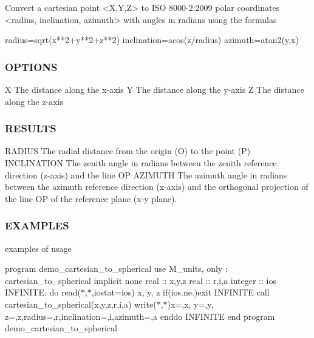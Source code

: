 \begin{DoxyVerb} Convert a cartesian point <X,Y,Z> to ISO 8000-2:2009 polar coordinates <radius,
 inclination, azimuth> with angles in radians using the formulas

   radius=sqrt(x**2+y**2+z**2)
   inclination=acos(z/radius)
   azimuth=atan2(y,x)
\end{DoxyVerb}


\subsubsection*{O\+P\+T\+I\+O\+NS}

X The distance along the x-\/axis Y The distance along the y-\/axis Z The distance along the z-\/axis

\subsubsection*{R\+E\+S\+U\+L\+TS}

\begin{DoxyVerb}RADIUS       The radial distance from the origin (O) to the point (P)
INCLINATION  The zenith angle in radians between the zenith reference direction
             (z-axis) and the line OP
AZIMUTH      The azimuth angle in radians between the azimuth reference direction
             (x-axis) and the orthogonal projection of the line OP of the
             reference plane (x-y plane).
\end{DoxyVerb}


\subsubsection*{E\+X\+A\+M\+P\+L\+ES}

examples of usage

program demo\+\_\+cartesian\+\_\+to\+\_\+spherical use M\+\_\+units, only \+: cartesian\+\_\+to\+\_\+spherical implicit none real \+:\+: x,y,z real \+:\+: r,i,a integer \+:\+: ios I\+N\+F\+I\+N\+I\+TE\+: do read($\ast$,$\ast$,iostat=ios) x, y, z if(ios.\+ne.)exit I\+N\+F\+I\+N\+I\+TE call cartesian\+\_\+to\+\_\+spherical(x,y,z,r,i,a) write($\ast$,$\ast$)\textquotesingle{}x=\textquotesingle{},x,\textquotesingle{} y=\textquotesingle{},y,\textquotesingle{} z=\textquotesingle{},z,\textquotesingle{}radius=\textquotesingle{},r,\textquotesingle{}inclination=\textquotesingle{},i,\textquotesingle{}azimuth=\textquotesingle{},a enddo I\+N\+F\+I\+N\+I\+TE end program demo\+\_\+cartesian\+\_\+to\+\_\+spherical \mbox{\label{namespacem__units_ac02800d0ec7fcffc2fdb2a2216770678}} 
